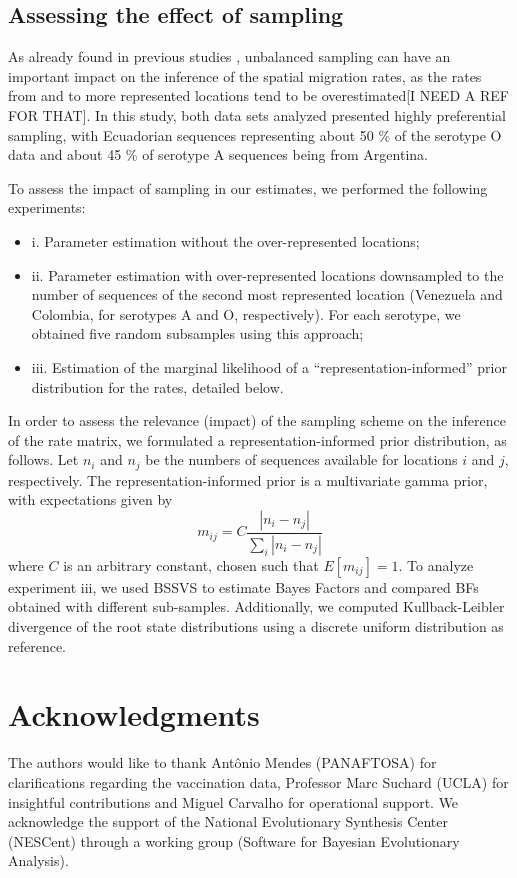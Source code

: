 \documentclass[10pt]{article}
\begin{document}
\subsection*{Assessing the effect of sampling}

As already found in previous studies \cite{Faria2012, Lemey2013}, unbalanced sampling can have an important impact on the inference of the spatial migration rates, as the rates from and to more represented locations tend to be overestimated[I NEED A REF FOR THAT]. In this study, both data sets analyzed presented highly preferential sampling, with Ecuadorian sequences representing about 50 \% of the serotype O data and about 45 \% of serotype A sequences being from Argentina.

To assess the impact of sampling in our estimates, we performed the following experiments:
\begin{itemize}
 \item i. Parameter estimation without the over-represented locations;
 \item ii. Parameter estimation with over-represented locations downsampled to the number of sequences of the second most represented location (Venezuela and Colombia, for serotypes A and O, respectively). For each serotype, we obtained five random subsamples using this approach;
 \item iii. Estimation of the marginal likelihood of a ``representation-informed'' prior distribution for the rates, detailed below.
\end{itemize}

In order to assess the relevance (impact) of the sampling scheme on the inference of the rate matrix, we formulated a representation-informed prior distribution, as follows. Let $n_i$ and $n_j$ be the numbers of sequences available for locations $i$ and $j$, respectively. The representation-informed prior is a multivariate gamma prior, with expectations given by
\begin{equation}
 m_{ij}=C\frac{|n_i-n_j|}{\sum_i|n_i-n_j|}
\end{equation}
where $C$ is an arbitrary constant, chosen such that $E[m_{ij}]=1$. To analyze experiment iii, we used BSSVS to estimate Bayes Factors and compared BFs obtained with different sub-samples. Additionally, we computed Kullback-Leibler divergence \cite{KL,roots} of the root state distributions using a discrete uniform distribution as reference. 

\section*{Acknowledgments}
The authors would like to thank Ant\^onio Mendes (PANAFTOSA) for clarifications regarding the vaccination data, Professor Marc Suchard (UCLA) for insightful contributions and Miguel Carvalho for operational support.
We acknowledge the support of the National Evolutionary Synthesis Center (NESCent) through a working group (Software for Bayesian Evolutionary Analysis).
\end{document}
